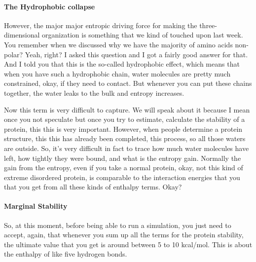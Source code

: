 \paragraph{The Hydrophobic collapse}

However, the major major entropic driving force for making the three-dimensional organization is something that we kind of touched upon last week. You remember when we discussed why we have the majority of amino acids non-polar? Yeah, right? I asked this question and I got a fairly good answer for that. And I told you that this is the so-called hydrophobic effect, which means that when you have such a hydrophobic chain, water molecules are pretty much constrained, okay, if they need to contact. But whenever you can put these chains together, the water leaks to the bulk and entropy increases.

Now this term is very difficult to capture. We will speak about it because I mean once you not speculate but once you try to estimate, calculate the stability of a protein, this this is very important. However, when people determine a protein structure, this this has already been completed, this process, so all those waters are outside. So, it’s very difficult in fact to trace how much water molecules have left, how tightly they were bound, and what is the entropy gain. Normally the gain from the entropy, even if you take a normal protein, okay, not this kind of extreme disordered protein, is comparable to the interaction energies that you that you get from all these kinds of enthalpy terms. Okay?

\paragraph{Marginal Stability}
So, at this moment, before being able to run a simulation, you just need to accept, again, that whenever you sum up all the terms for the protein stability, the ultimate value that you get is around between 5 to 10 kcal/mol. This is about the enthalpy of like five hydrogen bonds.

